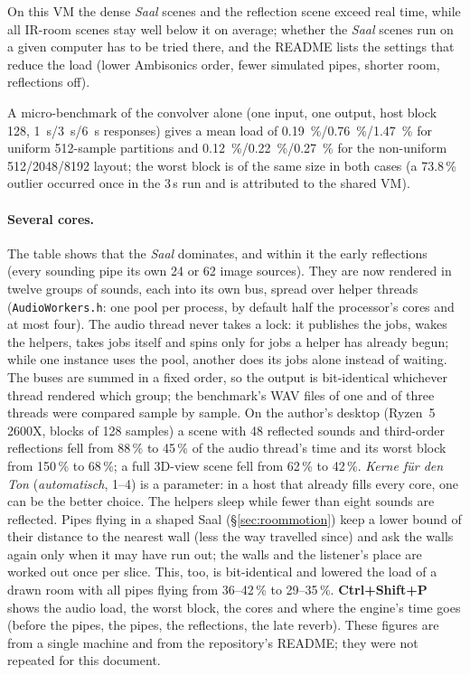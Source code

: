 \documentclass[11pt,a4paper,parskip=half,DIV=11,toc=bibliography]{scrartcl}
\newcommand{\ui}[1]{\emph{#1}}                 %
\newcommand{\fn}[1]{\mbox{\texttt{#1}}}
\begin{document}
On this VM the dense \ui{Saal} scenes and the reflection scene exceed real time, while all IR-room scenes
stay well below it on average; whether the \ui{Saal} scenes run on a given computer has to be tried there,
and the README lists the settings that reduce the load (lower Ambisonics order, fewer simulated pipes,
shorter room, reflections off).

A micro-benchmark of the convolver alone (one input, one output, host block 128, \SI{1}{s}/\SI{3}{s}/\SI{6}{s}
responses) gives a mean load of \SI{0.19}{\percent}/\SI{0.76}{\percent}/\SI{1.47}{\percent} for uniform
512-sample partitions and \SI{0.12}{\percent}/\SI{0.22}{\percent}/\SI{0.27}{\percent} for the non-uniform
512/2048/8192 layout; the worst block is of the same size in both cases (a 73.8\,\% outlier occurred once in
the 3\,s run and is attributed to the shared VM).

\paragraph{Several cores.} The table shows that the \ui{Saal} dominates, and within it the early reflections (every sounding pipe
its own 24 or 62 image sources). They are now rendered in twelve groups of sounds, each into its own bus, spread over helper threads
(\fn{AudioWorkers.h}: one pool per process, by default half the processor's cores and at most four). The audio thread never takes a
lock: it publishes the jobs, wakes the helpers, takes jobs itself and spins only for jobs a helper has already begun; while one instance
uses the pool, another does its jobs alone instead of waiting. The buses are summed in a fixed order, so the output is bit-identical whichever thread
rendered which group; the benchmark's WAV files of one and of three threads were compared sample by sample. On the author's desktop
(Ryzen~5 2600X, blocks of 128 samples) a scene with 48 reflected sounds and third-order reflections fell from 88\,\% to 45\,\% of the
audio thread's time and its worst block from 150\,\% to 68\,\%; a full 3D-view scene fell from 62\,\% to 42\,\%. \ui{Kerne für den Ton}
(\emph{automatisch}, 1--4) is a parameter: in a host that already fills every core, one can be the better choice. The helpers sleep while
fewer than eight sounds are reflected. Pipes flying in a shaped Saal (\S\ref{sec:roommotion}) keep a lower bound of their distance to the
nearest wall (less the way travelled since) and ask the walls again only when it may have run out; the walls and the listener's place are
worked out once per slice. This, too, is bit-identical and lowered the load of a drawn room with all pipes flying from 36--42\,\% to
29--35\,\%. \textbf{Ctrl+Shift+P} shows the audio load, the worst block, the cores and where the engine's time goes (before the pipes, the pipes,
the reflections, the late reverb). These figures are from a single machine and from the repository's README; they were not repeated for
this document.
\end{document}
